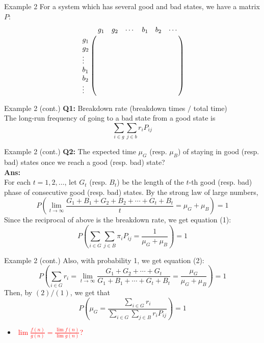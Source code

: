 \documentclass[mathserif]{beamer}
\begin{document}
\begin{frame}{Example 2}
	For a system which has several good and bad states, we have a matrix $P$:
	\[
	\bordermatrix{~      & g_1 & g_2 & \cdots & b_1 & b_2 & \cdots \cr
                  g_1    &     &     &        &     &     &        \cr
                  g_2    &     &     &        &     &     &        \cr
                  \vdots &     &     &        &     &     &        \cr
                  b_1    &     &     &        &     &     &        \cr
                  b_2    &     &     &        &     &     &        \cr
                  \vdots &     &     &        &     &     &        \cr}
	\]
\end{frame}

\begin{frame}{Example 2 (cont.)}
	\textbf{Q1:} Breakdown rate (breakdown times $/$ total time)\\
	The long-run frequency of going to a bad state from a good state is
	\[
	\sum_{i \in g} \sum_{j \in b} r_i P_{ij}
	\]
\end{frame}

\begin{frame}{Example 2 (cont.)}
	\textbf{Q2:} The expected time $\mu_G$ (resp. $\mu_B$) of staying in good (resp. bad) states once we reach a good (resp. bad) state? \\
	\textbf{Ans:} \\
	For each $t = 1, 2, \ldots$, let $G_t$ (resp. $B_t$) be the length of the $t$-th good (resp. bad) phase of consecutive good (resp. bad) states.
	By the strong law of large numbers, 
	\[
	P\left( \lim_{t\to\infty} \frac{G_1 + B_1 + G_2 + B_2 + \cdots + G_t + B_t}{t} = \mu_G + \mu_B \right) = 1
	\]
	Since the reciprocal of above is the breakdown rate, we get equation (1):
	\[
	P\left( \sum_{i \in G} \sum_{j \in B} \pi_i P_{ij} = \frac{1}{\mu_G + \mu_B} \right) = 1
	\]
\end{frame}

\begin{frame}{Example 2 (cont.)}
	Also, with probability 1, we get equation (2):
	\[
	P\left( \sum_{i \in G} r_i = 
	\lim_{t\to\infty}\frac{G_1 + G_2 + \cdots + G_t}{G_1 + B_1 + \cdots + G_t + B_t}
	= \frac{\mu_G}{\mu_G + \mu_B} \right) = 1
	\]
	Then, by $(2)/(1)$, we get that
	\[
	P\left( \mu_G = \frac{\sum_{i \in G} r_i}{\sum_{i \in G}\sum_{j \in B} r_i P_{ij}} \right) = 1
	\]
	\begin{itemize}
	\item \textcolor{red}{$\lim \frac{f(n)}{g(n)} = \frac{\lim f(n)}{\lim g(n)}$?}
	\end{itemize}
\end{frame}
\end{document}
